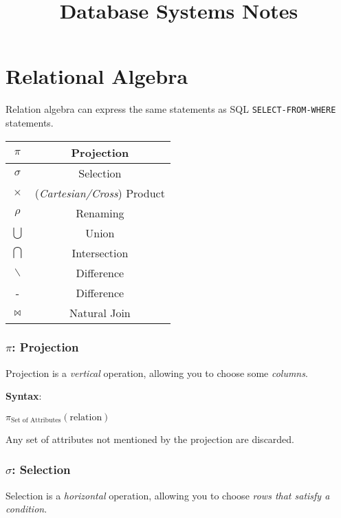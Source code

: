 \documentclass{article}
\begin{document}
\pagestyle{headings}

\title{Database Systems Notes}
\date{}
\maketitle

\section{Relational Algebra}

Relation algebra can express the same statements as SQL \texttt{SELECT-FROM-WHERE} statements.

\begin{center}
  \begin{tabular}{|c|c|}
    \hline
    $\pi$ & Projection\\
    \hline
    $\sigma$ & Selection\\
    \hline
    $\times$ & (\textit{Cartesian/Cross}) Product\\
    \hline
    $\rho$ & Renaming\\
    \hline
    $\bigcup$ & Union\\
    \hline
    $\bigcap$ & Intersection\\
    \hline
    $\backslash$ & Difference\\
    \hline
    - & Difference\\
    \hline
    $\Join$ & Natural Join\\
    \hline
  \end{tabular}
\end{center}

\subsubsection{$\pi$: Projection}

Projection is a \textit{vertical} operation, allowing you to choose some \textit{columns}.

\textbf{Syntax}:

$\pi_{\text{Set of Attributes}}(\text{relation})$

Any set of attributes not mentioned by the projection are discarded.

\subsubsection{$\sigma$: Selection}

Selection is a \textit{horizontal} operation, allowing you to choose \textit{rows that satisfy a condition}.
\end{document}
